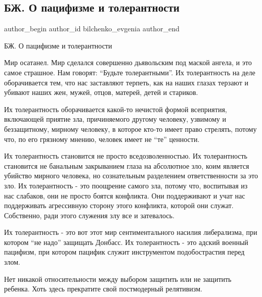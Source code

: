  
 
 
 
 
 
\subsection{БЖ. О пацифизме и толерантности}
\label{sec:19_02_2022.tg.bilchenko_evgenia.1.pacifizm_tolerantnost}
 
\ifcmt
 author_begin
   author_id bilchenko_evgenia
 author_end
\fi

БЖ. О пацифизме и толерантности


Мир осатанел. Мир сделался совершенно дьявольским под маской ангела, и это
самое страшное. Нам говорят: \enquote{Будьте толерантными}. Их толерантность на деле
оборачивается тем, что нас заставляют терпеть, как на наших глазах терзают и
убивают наших жен, мужей, отцов, матерей, детей и стариков.

Их толерантность оборачивается какой-то нечистой формой всеприятия, включающей
приятие зла, причиняемого другому человеку, узвимому и беззащитному, мирному
человеку, в которое кто-то имеет право стрелять, потому что, по его грязному
мнению, человек имеет не \enquote{те} ценности. 

Их толерантность становится не просто вседозволенностью. Их толерантность
становится не банальным закрыванием глаза на абсолютное зло, коим является
убийство мирного человека, но сознательным разделением ответственности за это
зло. Их толерантность - это поощрение самого зла, потому что, воспитывая из нас
слабаков, они не просто боятся конфликта. Они поддерживают и учат нас
поддерживать агрессивную сторону этого конфликта, которой они служат.
Собственно, ради этого служения злу все и затевалось.

Их толерантность - это вот этот мир сентиментального насилия либерализма, при
котором \enquote{не надо} защищать Донбасс. Их толерантность - это адский
военный пацифизм, при котором пацифик служит инструментом подобострастия перед
злом.

Нет никакой относительности между выбором защитить или не защитить ребенка.
Хоть здесь прекратите свой постмодерный релятивизм.
